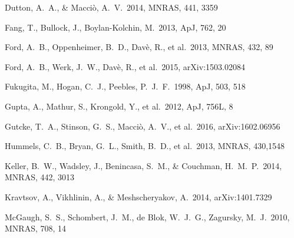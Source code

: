 \documentclass[useAMS,usenatbib]{mn2e}
\def \apj {ApJ}
\def \mnras {MNRAS}
\begin{document}
\begin{thebibliography}{}
 Dutton,
  A.~A., \& Macci{\`o}, A.~V.\ 2014, \mnras, 441, 3359 



    

 Fang, T., Bullock, J., Boylan-Kolchin, M.\ 2013, \apj, 762, 20

%
 Ford, A.~B., Oppenheimer, B.~D., Dav{\`e}, R., et al.\ 2013, \mnras, 432, 89

%
 Ford, A.~B., Werk, J.~W., Dav{\`e}, R., et al.\ 2015, arXiv:1503.02084

 Fukugita, M., Hogan, C.~J., Peebles, P.~J.~F.\ 1998, \apj, 503, 518


 Gupta, A., Mathur, S., Krongold, Y., et al.\ 2012, \apj, 756L, 8

 Gutcke, T.~A., Stinson, G.~S., Macci{\`o}, A.~V., et al.\ 2016, arXiv:1602.06956



%
 Hummels, C.~B., Bryan, G.~L., Smith, B.~D., et al.\ 2013, \mnras, 430,1548





 Keller, B.~W., Wadsley, 
  J., Benincasa, S.~M., \& Couchman, H.~M.~P.\ 2014, \mnras, 442, 3013

 Kravtsov, A., 
Vikhlinin, A., \& Meshscheryakov, A.\ 2014, arXiv:1401.7329 

  



 McGaugh, S.~S., 
Schombert, J.~M., de Blok, W.~J.~G., Zagursky, M.~J.\ 2010, \mnras,
708, 14


\end{thebibliography}
\end{document}
